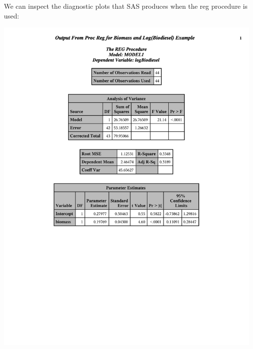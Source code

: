 We can inspect the diagnostic plots that SAS produces when the reg procedure is used:
\begin{center}
\includegraphics[scale=0.65,page=2,trim= 10mm 70mm 10mm 10mm]{slrbiodiesel}\\

\end{center}
